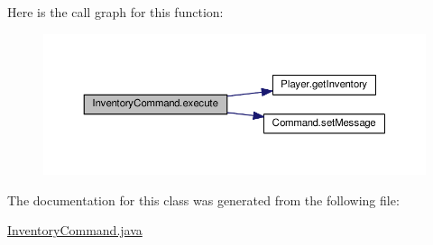 Here is the call graph for this function\-:
\nopagebreak
\begin{figure}[H]
\begin{center}
\leavevmode
\includegraphics[width=350pt]{classInventoryCommand_a103714a9704895e9d8ddd5bcd758e5f8_cgraph}
\end{center}
\end{figure}




The documentation for this class was generated from the following file\-:\begin{DoxyCompactItemize}
\item 
\hyperlink{InventoryCommand_8java}{Inventory\-Command.\-java}\end{DoxyCompactItemize}
